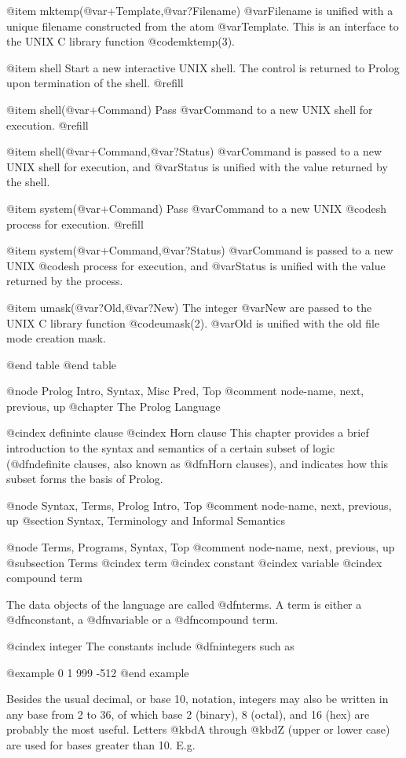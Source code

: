 @item mktemp(@var{+Template},@var{?Filename})
@var{Filename} is unified with a unique filename constructed from the
atom @var{Template}.  This is an interface to the UNIX C library
function @code{mktemp(3)}.

@item shell
Start a new interactive UNIX shell.  The control is returned to Prolog
upon termination of the shell. @refill

@item shell(@var{+Command})
Pass @var{Command} to a new UNIX shell for execution. @refill

@item shell(@var{+Command},@var{?Status})
@var{Command} is passed to a new UNIX shell for execution, and
@var{Status} is unified with the value returned by the shell.

@item system(@var{+Command})
Pass @var{Command} to a new UNIX @code{sh} process for execution. @refill

@item system(@var{+Command},@var{?Status})
@var{Command} is passed to a new UNIX @code{sh} process for execution,
and @var{Status} is unified with the value returned by the process.

@item umask(@var{?Old},@var{?New})
The integer @var{New} are passed to the UNIX C library function
@code{umask(2)}.  @var{Old} is unified with the old file mode creation
mask.

@end table
@end table

@node Prolog Intro, Syntax, Misc Pred, Top
@comment  node-name,  next,  previous,  up
@chapter The Prolog Language

@cindex defininte clause
@cindex Horn clause
This chapter provides a brief introduction to the syntax and semantics of
a certain subset of logic (@dfn{definite clauses}, also known as @dfn{Horn
clauses}), and indicates how this subset forms the basis of Prolog.

@node Syntax, Terms, Prolog Intro, Top
@comment  node-name,  next,  previous,  up
@section Syntax, Terminology and Informal Semantics

@node Terms, Programs, Syntax, Top
@comment  node-name,  next,  previous,  up
@subsection Terms
@cindex term
@cindex constant
@cindex variable
@cindex compound term

The data objects of the language are called @dfn{terms}.  A term is either
a @dfn{constant}, a @dfn{variable} or a @dfn{compound term}.

@cindex integer
The constants include @dfn{integers} such as

@example
0   1   999   -512
@end example

Besides the usual decimal, or base 10, notation, integers may also be
written in any base from 2 to 36, of which base 2 (binary), 8 (octal),
and 16 (hex) are probably the most useful.  Letters @kbd{A} through
@kbd{Z} (upper or lower case) are used for bases greater than 10.
E.g.

